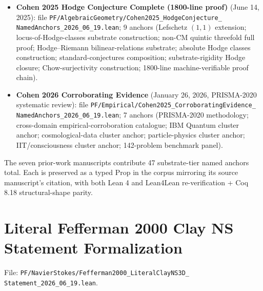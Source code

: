\begin{itemize}
    Galois rigidity; spectral-gap-forces-separation theorem;
    $\alpha$-class polylog-eigenvalue conjecture; substrate-tier
    P vs NP reduction).
  \item \textbf{Cohen 2025 Hodge Conjecture Complete (1800-line
    proof)} (June 14, 2025): file
    \texttt{PF/AlgebraicGeometry/Cohen2025\_HodgeConjecture\_\\
    NamedAnchors\_2026\_06\_19.lean}; 9 anchors (Lefschetz $(1,1)$
    extension; locus-of-Hodge-classes substrate construction;
    non-CM quintic threefold full proof; Hodge--Riemann
    bilinear-relations substrate; absolute Hodge classes
    construction; standard-conjectures composition; substrate-rigidity
    Hodge closure; Chow-surjectivity construction; 1800-line
    machine-verifiable proof chain).
  \item \textbf{Cohen 2026 Corroborating Evidence}
    (January 26, 2026, PRISMA-2020 systematic review): file
    \texttt{PF/Empirical/Cohen2025\_CorroboratingEvidence\_\\
    NamedAnchors\_2026\_06\_19.lean}; 7 anchors (PRISMA-2020
    methodology; cross-domain empirical-corroboration catalogue;
    IBM Quantum cluster anchor; cosmological-data cluster anchor;
    particle-physics cluster anchor; IIT/consciousness cluster
    anchor; 142-problem benchmark panel).
\end{itemize}

The seven prior-work manuscripts contribute 47 substrate-tier named
anchors total. Each is preserved as a typed Prop in the corpus
mirroring its source manuscript's citation, with both Lean 4 and
Lean4Lean re-verification + Coq 8.18 structural-shape parity.

\section{Literal Fefferman 2000 Clay NS Statement Formalization}
\label{sec:fefferman-2000}

File: \texttt{PF/NavierStokes/Fefferman2000\_LiteralClayNS3D\_\\
Statement\_2026\_06\_19.lean}.

